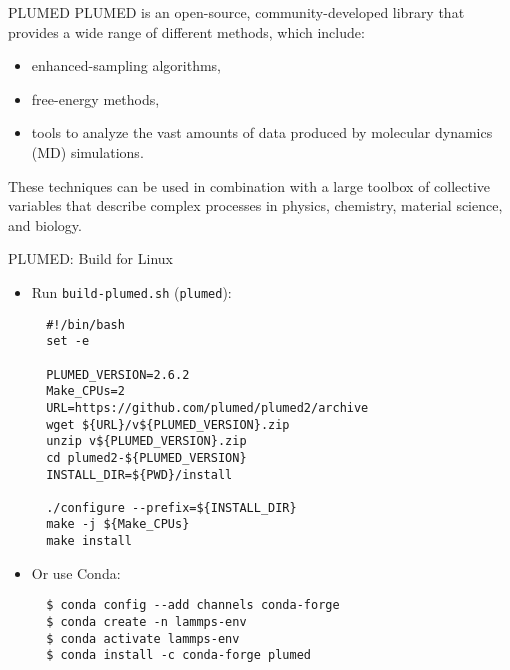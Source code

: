 \documentclass[10pt]{beamer}
\begin{document}
\begin{frame}{PLUMED}
  PLUMED is an open-source, community-developed library that provides a wide range of different methods, which include:
  \begin{itemize}
    \item enhanced-sampling algorithms,
    \item free-energy methods,
    \item tools to analyze the vast amounts of data produced by molecular dynamics (MD) simulations.
  \end{itemize}
  These techniques can be used in combination with a large toolbox of collective variables that describe complex processes in physics, chemistry, material science, and biology.
\end{frame}

\begin{frame}[fragile]{PLUMED: Build for Linux}
  \begin{itemize}
    \item Run \texttt{build-plumed.sh} (\texttt{plumed}):
    \begin{lstlisting}
  #!/bin/bash
  set -e

  PLUMED_VERSION=2.6.2
  Make_CPUs=2
  URL=https://github.com/plumed/plumed2/archive
  wget ${URL}/v${PLUMED_VERSION}.zip
  unzip v${PLUMED_VERSION}.zip
  cd plumed2-${PLUMED_VERSION}
  INSTALL_DIR=${PWD}/install

  ./configure --prefix=${INSTALL_DIR}
  make -j ${Make_CPUs}
  make install
    \end{lstlisting}

    \item Or use Conda:
    \begin{lstlisting}
  $ conda config --add channels conda-forge
  $ conda create -n lammps-env
  $ conda activate lammps-env
  $ conda install -c conda-forge plumed
    \end{lstlisting}
  \end{itemize}
\end{frame}
\end{document}
